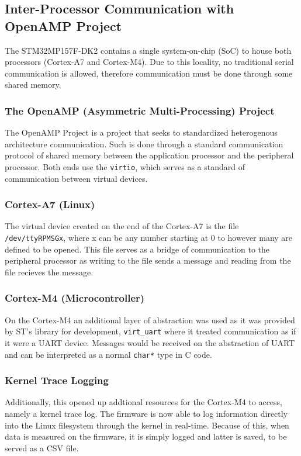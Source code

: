 \documentclass[12pt]{article}
\begin{document}
\subsection{Inter-Processor Communication with OpenAMP Project}
The STM32MP157F-DK2 contains a single system-on-chip (SoC) to house both processors (Cortex-A7 and Cortex-M4). 
Due to this locality, no traditional serial communication is allowed, therefore communication must be done through
some shared memory. 

\subsubsection{The OpenAMP (Asymmetric Multi-Processing) Project}
The OpenAMP Project is a project that seeks to standardized heterogenous architecture communication. Such
is done through a standard communication protocol of shared memory between the application processor 
and the peripheral processor. Both ends use the \verb+virtio+, which serves as a standard of communication between
virtual devices.

\subsubsection{Cortex-A7 (Linux)}
The virtual device created on the end of the Cortex-A7 is the file \verb+/dev/ttyRPMSGx+, where x
can be any number starting at 0 to however many are defined to be opened. This file serves as a bridge of
communication to the peripheral processor as writing to the file sends a message and reading from the file
recieves the message. 

\subsubsection{Cortex-M4 (Microcontroller)}
On the Cortex-M4 an additional layer of abstraction was used as it was provided by 
ST's library for development, \verb+virt_uart+ where it treated communication as if it were a UART
device. Messages would be received on the abstraction of UART and can be interpreted as a normal \verb+char*+
type in C code. 

\subsubsection{Kernel Trace Logging}
Additionally, this opened up addtional resources for the Cortex-M4 to access, namely a kernel trace log.
The firmware is now able to log information directly into the Linux filesystem through the kernel in real-time.
Because of this, when data is measured on the firmware, it is simply logged and latter is saved, to be served as 
a CSV file.
\end{document}
